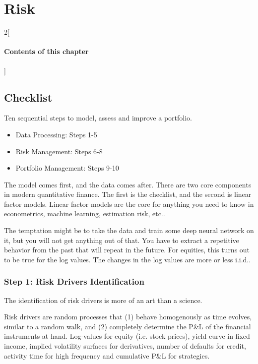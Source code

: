 \chapter{Risk}

\begin{multicols}{2}[\subsubsection*{Contents of this chapter}]
\end{multicols}


\section{Checklist}

Ten sequential steps to model, assess and improve a portfolio.

\begin{itemize}
\item Data Processing: Steps 1-5
\item Risk Management: Steps 6-8
\item Portfolio Management: Steps 9-10
\end{itemize}

The model comes first, and the data comes after. There are two core components in modern quantitative finance. The first is the checklist, and the second is linear factor models. Linear factor models are the core for anything you need to know in econometrics, machine learning, estimation risk, etc.. 

The temptation might be to take the data and train some deep neural network on it, but you will not get anything out of that. You have to extract a repetitive behavior from the past that will repeat in the future. For equities, this turns out to be true for the log values. The changes in the log values are more or less i.i.d.. 


\subsection{Step 1: Risk Drivers Identification}

The identification of risk drivers is more of an art than a science. 

Risk drivers are random processes that (1) behave homogenously as time evolves, similar to a random walk, and (2) completely determine the P\&L of the financial instruments at hand. Log-values for equity (i.e. stock prices), yield curve in fixed income, implied volatility surfaces for derivatives, number of defaults for credit, activity time for high frequency and cumulative P\&L for strategies. 

